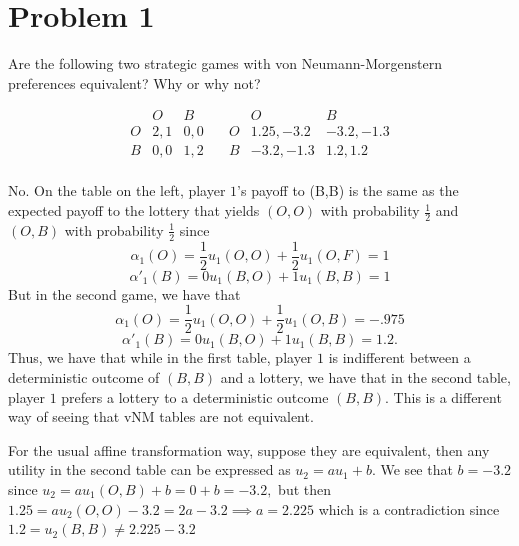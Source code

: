 \documentclass[11pt]{article}
\begin{document}
	
	
	\psetheader
\section*{Problem 1}

\begin{problem}
Are the following two strategic games with von Neumann-Morgenstern preferences equivalent? Why or why not?
    

\[
    \begin{array}{c|cc}
        & O & B \\
        \hline
        O & 2, 1 & 0, 0 \\
        B & 0, 0 & 1, 2 \\
    \end{array}
    \quad
    \begin{array}{c|cc}
        & O & B \\
        \hline
        O & 1.25, -3.2 & -3.2, -1.3 \\
        B & -3.2, -1.3 & 1.2, 1.2 \\
    \end{array}
    \]
    
\end{problem}
\begin{solution}
    No.  On the table on the left, player $1$'s payoff to (B,B) is the same as the expected payoff to the lottery that yields $(O,O)$ with probability $\frac{1}{2}$ and $(O,B)$ with probability $\frac{1}{2}$ since
    \[\alpha_1(O) = \frac{1}{2}u_1(O,O) + \frac{1}{2}u_1(O,F) = 1\]
    \[\alpha'_1(B) = 0u_1(B,O) + 1u_1(B,B) = 1\]
    But in the second game, we have that 
    \[\alpha_1(O) = \frac{1}{2}u_1(O,O) + \frac{1}{2}u_1(O,B) = -.975\]
    \[\alpha'_1(B) = 0 u_1(B,O) + 1 u_1(B,B) = 1.2.\] Thus, we have that while in the first table, player $1$ is indifferent between a deterministic outcome of $(B,B)$ and a lottery, we have that in the second table, player $1$ prefers a lottery to a deterministic outcome $(B,B).$ This is a different way of seeing that vNM tables are not equivalent. 

    For the usual affine transformation way, suppose they are equivalent, then any utility in the second table can be expressed as $u_2 = au_1 + b.$ We see that $b = -3.2$ since $u_2 = au_1(O,B) + b = 0 + b = -3.2,$ but then $1.25 = au_2(O,O) - 3.2 = 2a - 3.2 \implies a = 2.225$ which is a contradiction since $1.2 = u_2(B,B) \neq 2.225 - 3.2$
\end{solution}
\end{document}
